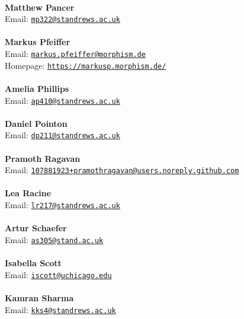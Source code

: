 \documentclass[a4paper,11pt]{report}
\begin{document}
\begin{titlepage}
{\mbox{}\\
\small \noindent \textbf{ Matthew Pancer\\
  }  Email: \href{mailto://mp322@st-andrews.ac.uk} {\texttt{mp322@st\texttt{}andrews.ac.uk}}}\\
{\mbox{}\\
\small \noindent \textbf{ Markus Pfeiffer\\
   }  Email: \href{mailto://markus.pfeiffer@morphism.de} {\texttt{markus.pfeiffer@morphism.de}}\\
  Homepage: \href{https://markusp.morphism.de/} {\texttt{https://markusp.morphism.de/}}}\\
{\mbox{}\\
\small \noindent \textbf{ Amelia Phillips\\
  }  Email: \href{mailto://ap410@st-andrews.ac.uk} {\texttt{ap410@st\texttt{}andrews.ac.uk}}}\\
{\mbox{}\\
\small \noindent \textbf{ Daniel Pointon\\
  }  Email: \href{mailto://dp211@st-andrews.ac.uk} {\texttt{dp211@st\texttt{}andrews.ac.uk}}}\\
{\mbox{}\\
\small \noindent \textbf{ Pramoth Ragavan\\
  }  Email: \href{mailto://107881923+pramothragavan@users.noreply.github.com} {\texttt{107881923+pramothragavan@users.noreply.github.com}}}\\
{\mbox{}\\
\small \noindent \textbf{ Lea Racine\\
  }  Email: \href{mailto://lr217@st-andrews.ac.uk} {\texttt{lr217@st\texttt{}andrews.ac.uk}}}\\
{\mbox{}\\
\small \noindent \textbf{ Artur Schaefer\\
  }  Email: \href{mailto://as305@st-and.ac.uk} {\texttt{as305@st\texttt{}and.ac.uk}}}\\
{\mbox{}\\
\small \noindent \textbf{ Isabella Scott\\
  }  Email: \href{mailto://iscott@uchicago.edu} {\texttt{iscott@uchicago.edu}}}\\
{\mbox{}\\
\small \noindent \textbf{ Kamran Sharma\\
  }  Email: \href{mailto://kks4@st-andrews.ac.uk} {\texttt{kks4@st\texttt{}andrews.ac.uk}}}\\

\end{titlepage}
\end{document}
